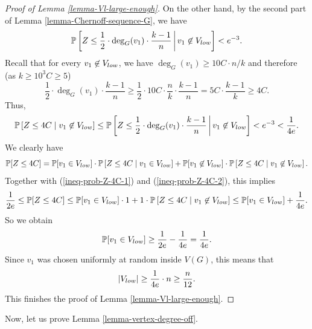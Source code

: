 \documentclass[11pt]{article}
\theoremstyle{definition}
\numberwithin{equation}{section}
\begin{document}
\begin{proof}[Proof of Lemma \ref{lemma-Vl-large-enough}]
On the other hand, by the second part of Lemma \ref{lemma-Chernoff-sequence-G}, we have
\[\mathbb{P}\left[ Z\leq \frac{1}{2}\cdot \deg_G(v_1)\cdot \frac{k-1}{n}\,\bigg\vert\,  v_1\not\in V_{\textnormal{low}}\right]<e^{-3}.\]
Recall that for every $v_1\not\in V_{\textnormal{low}}$, we have $\deg_G(v_1)\geq 10C\cdot n/k$ and therefore (as $k\geq 10^3C\geq 5$)
\[\frac{1}{2}\cdot \deg_G(v_1)\cdot \frac{k-1}{n}\geq \frac{1}{2}\cdot 10C\cdot \frac{n}{k}\cdot \frac{k-1}{n}=5C\cdot \frac{k-1}{k}\geq 4C.\]
Thus,
\begin{equation}\label{ineq-prob-Z-4C-2}
\mathbb{P}\left[ Z\leq 4C\mid v_1\not\in V_{\textnormal{low}}\right]\leq \mathbb{P}\left[ Z\leq \frac{1}{2}\cdot \deg_G(v_1)\cdot \frac{k-1}{n} \,\bigg\vert\,  v_1\not\in V_{\textnormal{low}}\right]<e^{-3}<\frac{1}{4e}.
\end{equation}
We clearly have
\[\mathbb{P}[Z\leq 4C]=\mathbb{P}[v_1\in V_{\textnormal{low}}]\cdot \mathbb{P}\left[ Z\leq 4C\mid v_1\in V_{\textnormal{low}}\right]+\mathbb{P}[v_1\not\in V_{\textnormal{low}}]\cdot \mathbb{P}\left[ Z\leq 4C\mid v_1\not\in V_{\textnormal{low}}\right].\]
Together with (\ref{ineq-prob-Z-4C-1}) and  (\ref{ineq-prob-Z-4C-2}), this implies
\[\frac{1}{2e}\leq \mathbb{P}[Z\leq 4C]\leq \mathbb{P}[v_1\in V_{\textnormal{low}}]\cdot 1+1\cdot \mathbb{P}\left[ Z\leq 4C\mid v_1\not\in V_{\textnormal{low}}\right]\leq \mathbb{P}[v_1\in V_{\textnormal{low}}]+\frac{1}{4e}.\]
So we obtain
\[\mathbb{P}[v_1\in V_{\textnormal{low}}]\geq \frac{1}{2e}-\frac{1}{4e}=\frac{1}{4e}.\]
Since $v_1$ was chosen uniformly at random inside $V(G)$, this means that
\[\vert V_{\textnormal{low}}\vert\geq \frac{1}{4e}\cdot n\geq \frac{n}{12}.\]
This finishes the proof of Lemma \ref{lemma-Vl-large-enough}.\end{proof}

Now, let us prove Lemma \ref{lemma-vertex-degree-off}.
\end{document}
